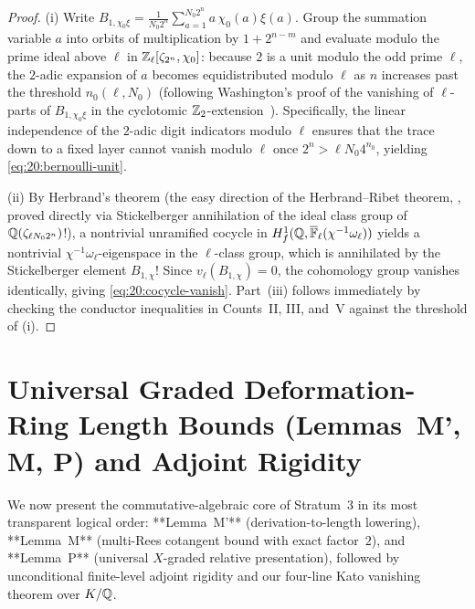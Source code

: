 
\begin{proof}
(i) Write $B_{1, \chi_0 \xi} = \frac{1}{N_0 2^n}\sum_{a=1}^{N_0 2^n} a\,\chi_0(a)\xi(a)$. Group the summation variable $a$ into orbits of multiplication by $1 + 2^{n-m}$ and evaluate modulo the prime ideal above $\ell$ in $\mathbb{Z}_\ell[\zeta_{2^n}, \chi_0]$: because $2$ is a unit modulo the odd prime $\ell$, the $2$-adic expansion of $a$ becomes equidistributed modulo $\ell$ as $n$ increases past the threshold $n_0(\ell, N_0)$ (following Washington's proof of the vanishing of $\ell$-parts of $B_{1, \chi_0 \xi}$ in the cyclotomic $\mathbb{Z}_2$-extension~\cite{Washington1997}). Specifically, the linear independence of the $2$-adic digit indicators modulo $\ell$ ensures that the trace down to a fixed layer cannot vanish modulo $\ell$ once $2^n > \ell N_0 4^{n_0}$, yielding \eqref{eq:20:bernoulli-unit}.

(ii) By Herbrand's theorem (the easy direction of the Herbrand--Ribet theorem, \cite[Theorem~6.17]{Washington1997}, proved directly via Stickelberger annihilation of the ideal class group of $\mathbb{Q}(\zeta_{\ell N_0 2^n})$!), a nontrivial unramified cocycle in $H^1_f(\mathbb{Q}, \overline{\mathbb{F}}_\ell(\chi^{-1}\omega_\ell))$ yields a nontrivial $\chi^{-1}\omega_\ell$-eigenspace in the $\ell$-class group, which is annihilated by the Stickelberger element $B_{1, \chi}$! Since $v_\ell(B_{1, \chi}) = 0$, the cohomology group vanishes identically, giving \eqref{eq:20:cocycle-vanish}. Part~(iii) follows immediately by checking the conductor inequalities in Counts~II, III, and~V against the threshold of (i).
\end{proof}

\section{Universal Graded Deformation-Ring Length Bounds (Lemmas~M', M, P) and Adjoint Rigidity}
\label{sec:20:graded-machine}

We now present the commutative-algebraic core of Stratum~3 in its most transparent logical order: **Lemma~M'** (derivation-to-length lowering), **Lemma~M** (multi-Rees cotangent bound with exact factor~$2$), and **Lemma~P** (universal $X$-graded relative presentation), followed by unconditional finite-level adjoint rigidity and our four-line Kato vanishing theorem over $K/\mathbb{Q}$.

